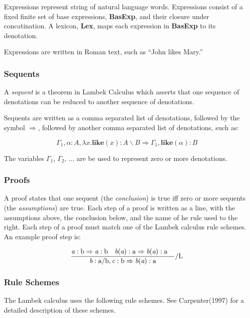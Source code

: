 \documentclass[11pt]{article}
\begin{document}
Expressions represent string of natural language words.  Expressions
consist of a fixed finite set of base expressions, \textbf{BasExp},
and their closure under concatination.  A lexicon, \textbf{Lex}, maps
each expression in \textbf{BasExp} to its denotation.

Expressions are written in Roman text, such as ``John likes Mary.''

\subsubsection{Sequents}

A \emph{sequent} is a theorem in Lambek Calculus which asserts that
one sequence of denotations can be reduced to another sequence of 
denotations. 

Sequents are written as a comma separated list of denotations,
followed by the symbol $\Rightarrow$, followed by another comma separated list
of denotations, such as:

$$\Gamma_1, \alpha:A, \lambda x.\textbf{like}(x):A\backslash B \Rightarrow \Gamma_1, \textbf{like}(\alpha): B$$

\noindent
The variables $\Gamma_1$, $\Gamma_2$, $\ldots$ are be used to represent
zero or more denotations.

\subsubsection{Proofs}

A proof states that one sequent (the \emph{conclusion}) is true iff
zero or more sequents (the \emph{assumptions}) are true.  Each step of
a proof is written as a line, with the assumptions above, the
conclusion below, and the name of he rule used to the right.  Each
step of a proof must match one of the Lambek calculus rule schemes.
An example proof step is:

$$
\frac{\textrm{$ 
  {{\textit{a}: \textrm{b} \Rightarrow \textit{a}: \textrm{b}}} \quad 
  {{\textit{b}(\textit{a}): \textrm{a} \Rightarrow \textit{b}(\textit{a}): \textrm{a}} } \quad $}}
      {\textit{b}: \textrm{a/b}, \textit{c}: \textrm{b} \Rightarrow \textit{b}(\textit{a}): \textrm{a}} \textrm{/L}
$$

\subsubsection{Rule Schemes}

The Lambek calculus uses the following rule schemes.  See
Carpenter(1997) for a detailed description of these schemes.
\end{document}
